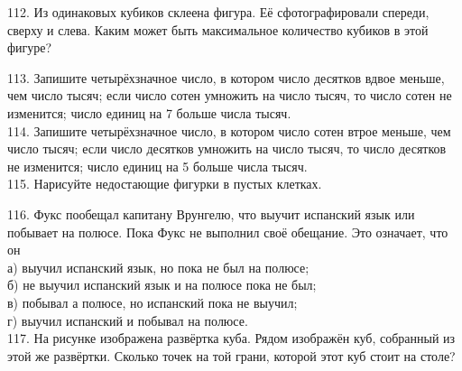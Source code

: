 \documentclass[12pt]{article}
\begin{document}
112. Из одинаковых кубиков склеена фигура. Её сфотографировали спереди, сверху и слева. Каким может быть максимальное количество кубиков в этой фигуре?
\begin{center}
\begin{figure}[ht!]
\end{figure}
\end{center}
113. Запишите четырёхзначное число, в котором число десятков вдвое меньше, чем число тысяч; если число сотен умножить на число тысяч, то число сотен не изменится; число единиц на 7 больше числа тысяч.\\
114. Запишите четырёхзначное число, в котором число сотен втрое меньше, чем число тысяч; если число десятков умножить на число тысяч, то число десятков не изменится; число единиц на 5 больше числа тысяч.\\
115. Нарисуйте недостающие фигурки в пустых клетках.
\begin{center}
\begin{figure}[ht!]
\end{figure}
\end{center}
116. Фукс пообещал капитану Врунгелю, что выучит испанский язык или побывает на полюсе. Пока Фукс не выполнил своё обещание. Это означает, что он\\
а) выучил испанский язык, но пока не был на полюсе;\\
б) не выучил испанский язык и на полюсе пока не был;\\
в) побывал а полюсе, но испанский пока не выучил;\\
г) выучил испанский и побывал на полюсе.\\
117. На рисунке изображена развёртка куба. Рядом изображён куб, собранный из этой же развёртки. Сколько точек на той грани, которой этот куб стоит на столе?
\begin{center}
\begin{figure}[ht!]
\end{figure}
\end{center}
\end{document}
